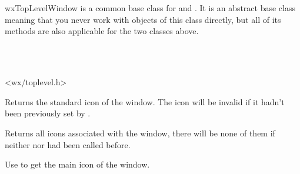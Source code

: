 
\section{}\label{wxtoplevelwindow}

wxTopLevelWindow is a common base class for  and
. It is an abstract base class meaning that you never
work with objects of this class directly, but all of its methods are also
applicable for the two classes above.


\\
\\


<wx/toplevel.h>




\label{wxtoplevelwindowgeticon}


Returns the standard icon of the window. The icon will be invalid if it hadn't
been previously set by .




\label{wxtoplevelwindowgeticons}


Returns all icons associated with the window, there will be none of them if
neither  nor
 had been called before.

Use  to get the main icon of the
window.


